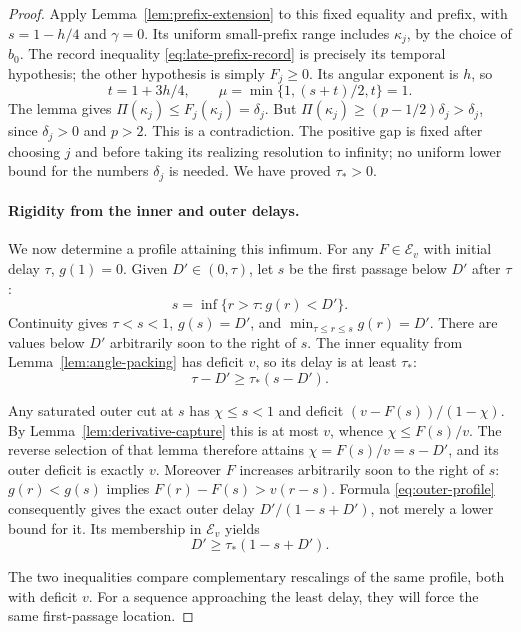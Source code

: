 \begin{proof}
Apply Lemma~\ref{lem:prefix-extension} to this fixed equality and
prefix, with $s=1-h/4$ and $\gamma=0$. Its uniform small-prefix
range includes $\kappa_j$, by the choice of $b_0$. The record inequality
\eqref{eq:late-prefix-record} is precisely its temporal hypothesis;
the other hypothesis is simply $F_j\ge0$. Its angular exponent is $h$,
so
\[
 t=1+3h/4,\qquad
 \mu=\min\{1,(s+t)/2,t\}=1.
\]
The lemma gives $\Pi(\kappa_j)\le F_j(\kappa_j)=\delta_j$.
But $\Pi(\kappa_j)\ge(p-1/2)\delta_j>\delta_j$, since
$\delta_j>0$ and $p>2$. This is a contradiction. The positive gap
is fixed after choosing $j$ and before taking its realizing resolution
to infinity; no uniform lower bound for the numbers $\delta_j$ is
needed. We have proved $\tau_*>0$.

\paragraph{Rigidity from the inner and outer delays.}
We now determine a profile attaining this infimum. For any
$F\in\mathcal E_v$ with initial delay $\tau$, $g(1)=0$. Given
$D'\in(0,\tau)$, let $s$ be the first passage below $D'$ after $\tau$:
\[
 s=\inf\{r>\tau:g(r)<D'\}.
\]
Continuity gives $\tau<s<1$, $g(s)=D'$, and
$\min_{\tau\le r\le s}g(r)=D'$. There are values below $D'$ arbitrarily
soon to the right of $s$. The inner equality from
Lemma~\ref{lem:angle-packing} has deficit $v$, so its delay is at least
$\tau_*$:
\begin{equation}
 \tau-D'\ge\tau_*(s-D').
 \label{eq:canonical-inner-passage}
\end{equation}

Any saturated outer cut at $s$ has $\chi\le s<1$ and deficit
$(v-F(s))/(1-\chi)$. By Lemma~\ref{lem:derivative-capture} this is at
most $v$, whence $\chi\le F(s)/v$. The reverse selection of that lemma
therefore attains $\chi=F(s)/v=s-D'$, and its outer deficit is exactly
$v$. Moreover $F$ increases arbitrarily soon to the right of $s$:
$g(r)<g(s)$ implies $F(r)-F(s)>v(r-s)$. Formula
\eqref{eq:outer-profile} consequently gives the exact outer delay
$D'/(1-s+D')$, not merely a lower bound for it. Its membership in
$\mathcal E_v$ yields
\begin{equation}
 D'\ge\tau_*(1-s+D').
 \label{eq:canonical-outer-passage}
\end{equation}

The two inequalities compare complementary rescalings of the same
profile, both with deficit $v$. For a sequence approaching the least
delay, they will force the same first-passage location.


\end{proof}
